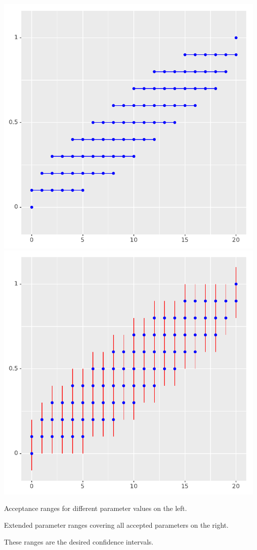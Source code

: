 \documentclass[landscape,footrule]{foils}
\begin{document}
\enlargethispage{0.5cm}
\centerline{
\includegraphics[scale=0.8]{bin_conf_intervals_i}
\includegraphics[scale=0.8]{bin_conf_intervals_ii}}
\begin{triangles}
\item Acceptance ranges for different parameter values on the left.
\item Extended parameter ranges covering all accepted parameters on the right.
\item These ranges are the desired confidence intervals.
\end{triangles}
\end{document}
